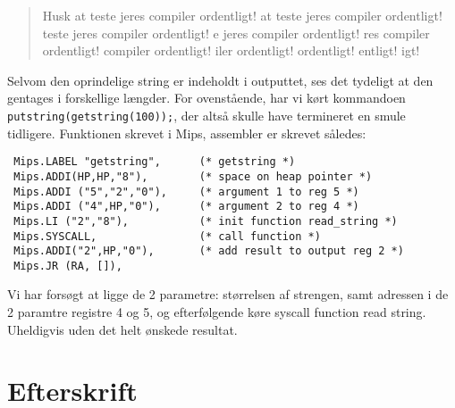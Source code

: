 \documentclass[12pt]{article}
\begin{document}
\begin{quote}
Husk at teste jeres compiler ordentligt!
 at teste jeres compiler ordentligt!
teste jeres compiler ordentligt!
e jeres compiler ordentligt!
res compiler ordentligt!
compiler ordentligt!
iler ordentligt!
 ordentligt!
entligt!
igt!
\end{quote}

Selvom den oprindelige string er indeholdt i outputtet, ses det tydeligt at den
gentages i forskellige længder. For ovenstående, har vi kørt kommandoen
\texttt{putstring(getstring(100));}, der altså skulle have termineret en smule
tidligere. Funktionen skrevet i Mips, assembler er skrevet således:


\begin{verbatim}
 Mips.LABEL "getstring",      (* getstring *)
 Mips.ADDI(HP,HP,"8"),        (* space on heap pointer *)
 Mips.ADDI ("5","2","0"),     (* argument 1 to reg 5 *)  
 Mips.ADDI ("4",HP,"0"),      (* argument 2 to reg 4 *)    
 Mips.LI ("2","8"),           (* init function read_string *)
 Mips.SYSCALL,                (* call function *)
 Mips.ADDI("2",HP,"0"),       (* add result to output reg 2 *)    
 Mips.JR (RA, []),
\end{verbatim}

Vi har forsøgt at ligge de 2 parametre: størrelsen af strengen, samt adressen i
de 2 paramtre registre 4 og 5, og efterfølgende køre syscall function
read string. Uheldigvis uden det helt ønskede resultat.




\section{Efterskrift}

{}

\end{document}
